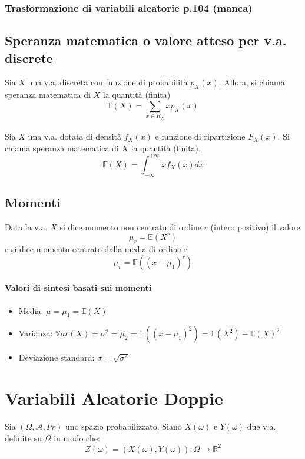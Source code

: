 \documentclass[a4paper]{report}
\begin{document}
  \subsection{Trasformazione di variabili aleatorie p.104 (manca)}

  \section{Speranza matematica o valore atteso per v.a. discrete}
  Sia $X$ una v.a. discreta con funzione di probabilità $p_X(x)$. Allora, si chiama speranza matematica di $X$ la quantità (finita)
  \[ \mathbb{E}(X) = \sum_{x \in R_X} x p_X(x) \]\\

  Sia $X$ una v.a. dotata di densità $f_X(x)$ e funzione di ripartizione $F_X(x)$. Si chiama speranza matematica di $X$ la quantità (finita).
  \[ \mathbb{E}(X) = \int_{-\infty}^{+\infty} x f_X(x) dx \]

  \section{Momenti}
  Data la v.a. $X$ si dice momento non centrato di ordine $r$ (intero positivo) il valore
  \[ \mu_r = \mathbb{E}(X^r)\]
  e si dice momento centrato dalla media di ordine r
  \[ \bar{\mu_r} = \mathbb{E}((x-\mu_1)^r)  \]

  \subsubsection{Valori di sintesi basati sui momenti}
  \begin{itemize}
    \item Media: $ \mu = \mu_1 = \mathbb{E}(X) $
    \item Varianza: $ \mathbb{V}ar(X) = \sigma^2 = \bar{\mu_2} = \mathbb{E}((x-\mu_1)^2) = \mathbb{E}(X^2) - \mathbb{E}(X)^2 $
    \item Deviazione standard: $ \sigma = \sqrt{\sigma^2} $
  \end{itemize}

  \chapter{Variabili Aleatorie Doppie}
  Sia $(\Omega, \mathcal{A}, Pr)$ uno spazio probabilizzato. Siano $X(\omega)$ e $Y(\omega)$ due v.a. definite su $\Omega$ in modo che:
  \[ Z(\omega) = (X(\omega),Y(\omega)) : \Omega \rightarrow \mathbb{R}^2 \]
\end{document}
